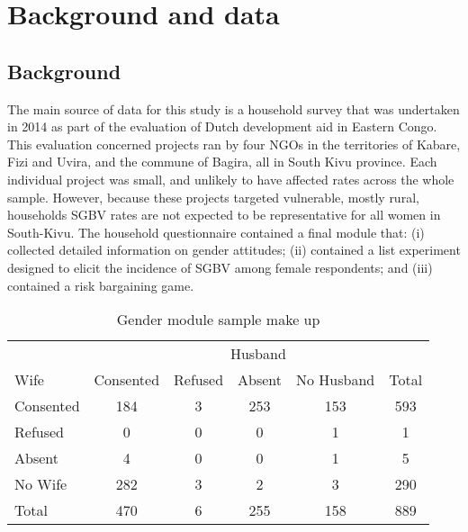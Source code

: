 \documentclass[11pt,a4paper]{scrartcl} %
\begin{document}
\section*{Background and data}
\subsection*{Background}
The main source of data for this study is a household survey that was undertaken in 2014 as part of the evaluation of Dutch development aid in Eastern Congo. This evaluation concerned projects ran by four NGOs in the territories of Kabare, Fizi and Uvira, and the commune of Bagira, all in South Kivu province. Each individual project was small, and unlikely to have affected rates across the whole sample. However, because these projects targeted vulnerable, mostly rural, households SGBV rates are not expected to be representative for all women in South-Kivu. The household questionnaire contained a final module that: (i) collected detailed information on gender attitudes; (ii) contained a list experiment designed to elicit the incidence of SGBV among female respondents; and (iii) contained a risk bargaining game. 

\begin{table}[htbp]
	\centering
	\caption{Gender module sample make up}
	\label{tab:bargsample}
	\begin{tabular}{l c c c c c}
		\toprule
		& \multicolumn{5}{c}{Husband} \\
Wife&Consented&Refused&Absent&No Husband&Total \\
\hline
Consented&184&3&253&153&593 \\
Refused&0&0&0&1&1 \\
Absent&4&0&0&1&5 \\
No Wife&282&3&2&3&290 \\
Total&470&6&255&158&889 \\
		\bottomrule
	\end{tabular}
\end{table}
\end{document}
